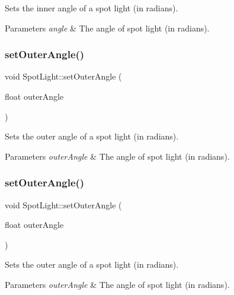 Sets the inner angle of a spot light (in radians).


\begin{DoxyParams}{Parameters}
{\em angle} & The angle of spot light (in radians). \\
\hline
\end{DoxyParams}
\mbox{\label{classSpotLight_a46246891e3aa5a6832f10049cb110abd}} 
\subsubsection{\texorpdfstring{set\+Outer\+Angle()}{setOuterAngle()}\hspace{0.1cm}{\footnotesize\ttfamily [1/2]}}
{\footnotesize\ttfamily void Spot\+Light\+::set\+Outer\+Angle (\begin{DoxyParamCaption}\item[{float}]{outer\+Angle }\end{DoxyParamCaption})}

Sets the outer angle of a spot light (in radians).


\begin{DoxyParams}{Parameters}
{\em outer\+Angle} & The angle of spot light (in radians). \\
\hline
\end{DoxyParams}
\mbox{\label{classSpotLight_a46246891e3aa5a6832f10049cb110abd}} 
\subsubsection{\texorpdfstring{set\+Outer\+Angle()}{setOuterAngle()}\hspace{0.1cm}{\footnotesize\ttfamily [2/2]}}
{\footnotesize\ttfamily void Spot\+Light\+::set\+Outer\+Angle (\begin{DoxyParamCaption}\item[{float}]{outer\+Angle }\end{DoxyParamCaption})}

Sets the outer angle of a spot light (in radians).


\begin{DoxyParams}{Parameters}
{\em outer\+Angle} & The angle of spot light (in radians). \\
\hline
\end{DoxyParams}
\mbox{\label{classSpotLight_aac5c9c4ac4c8e6d91d2d08c64116402b}} 
